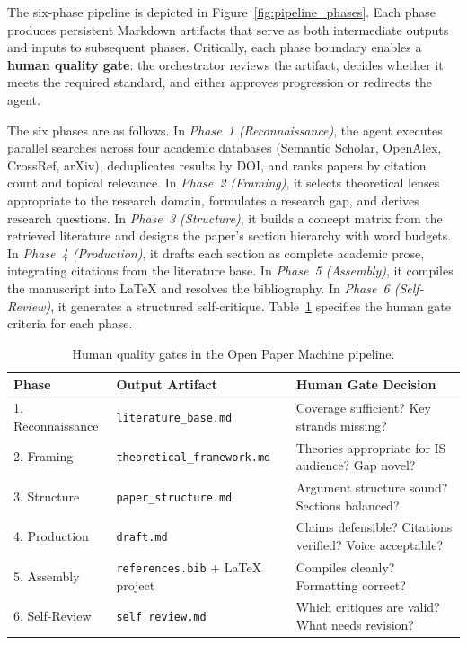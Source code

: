 \documentclass{article}
\begin{document}
The six-phase pipeline is depicted in Figure~\ref{fig:pipeline_phases}. Each phase produces persistent Markdown artifacts that serve as both intermediate outputs and inputs to subsequent phases. Critically, each phase boundary enables a \textbf{human quality gate}: the orchestrator reviews the artifact, decides whether it meets the required standard, and either approves progression or redirects the agent.

The six phases are as follows. In \textit{Phase~1 (Reconnaissance)}, the agent executes parallel searches across four academic databases (Semantic Scholar, OpenAlex, CrossRef, arXiv), deduplicates results by DOI, and ranks papers by citation count and topical relevance. In \textit{Phase~2 (Framing)}, it selects theoretical lenses appropriate to the research domain, formulates a research gap, and derives research questions. In \textit{Phase~3 (Structure)}, it builds a concept matrix from the retrieved literature and designs the paper's section hierarchy with word budgets. In \textit{Phase~4 (Production)}, it drafts each section as complete academic prose, integrating citations from the literature base. In \textit{Phase~5 (Assembly)}, it compiles the manuscript into \LaTeX{} and resolves the bibliography. In \textit{Phase~6 (Self-Review)}, it generates a structured self-critique. Table~\ref{tab:quality_gates} specifies the human gate criteria for each phase.

\begin{table}[ht]
\centering
\small
\caption{Human quality gates in the Open Paper Machine pipeline.}
\label{tab:quality_gates}
\begin{tabularx}{\textwidth}{@{} l X X @{}}
\toprule
\textbf{Phase} & \textbf{Output Artifact} & \textbf{Human Gate Decision} \\
\midrule
1. Reconnaissance & \texttt{literature\_base.md} & Coverage sufficient? Key strands missing? \\
2. Framing & \texttt{theoretical\_framework.md} & Theories appropriate for IS audience? Gap novel? \\
3. Structure & \texttt{paper\_structure.md} & Argument structure sound? Sections balanced? \\
4. Production & \texttt{draft.md} & Claims defensible? Citations verified? Voice acceptable? \\
5. Assembly & \texttt{references.bib} + \LaTeX{} project & Compiles cleanly? Formatting correct? \\
6. Self-Review & \texttt{self\_review.md} & Which critiques are valid? What needs revision? \\
\bottomrule
\end{tabularx}
\end{table}
\end{document}
